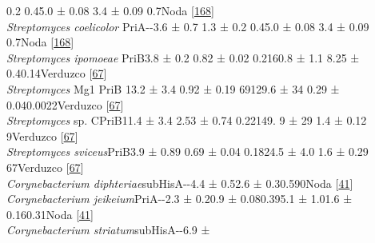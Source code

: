 \documentclass[12pt,twoside]{reedthesis}
\begin{document}
  0.2 \textbar{}0.4\textbar{}5.0 ± 0.08 \textbar{}3.4 ± 0.09
  \textbar{}0.7\textbar{}Noda
  {[}\protect\hyperlink{ref-noda-garcia_identification_2010}{168}{]}\textbar{}\\
  \textbar{} \emph{Streptomyces coelicolor}
  \textbar{}PriA\textbar{}-\textbar{}-\textbar{}3.6 ± 0.7 \textbar{}1.3 ±
  0.2 \textbar{}0.4\textbar{}5.0 ± 0.08 \textbar{}3.4 ± 0.09
  \textbar{}0.7\textbar{}Noda
  {[}\protect\hyperlink{ref-noda-garcia_identification_2010}{168}{]}\textbar{}\\
  \textbar{} \emph{Streptomyces ipomoeae}
  \textbar{}PriB\textbar{}\emph{\textbar{}}\textbar{}3.8 ± 0.2
  \textbar{}0.82 ± 0.02 \textbar{}0.21\textbar{}60.8 ± 1.1\textbar{} 8.25
  ± 0.4\textbar{}0.14\textbar{}Verduzco
  {[}\protect\hyperlink{ref-verduzco-castro_co-occurrence_2016}{67}{]}\textbar{}\\
  \textbar{} \emph{Streptomyces} Mg1
  \textbar{}PriB\textbar{}\emph{\textbar{}}\textbar{} 13.2 ± 3.4
  \textbar{}0.92 ± 0.19 \textbar{}69\textbar{}129.6 ± 34 \textbar{}0.29 ±
  0.04\textbar{}0.0022\textbar{}Verduzco
  {[}\protect\hyperlink{ref-verduzco-castro_co-occurrence_2016}{67}{]}\textbar{}\\
  \textbar{} \emph{Streptomyces} sp.
  C\textbar{}PriB\textbar{}\emph{\textbar{}}\textbar{}11.4 ± 3.4
  \textbar{}2.53 ± 0.74 \textbar{}0.22\textbar{}149. 9 ± 29\textbar{} 1.4
  ± 0.12 \textbar{}9\textbar{}Verduzco
  {[}\protect\hyperlink{ref-verduzco-castro_co-occurrence_2016}{67}{]}\textbar{}\\
  \textbar{} \emph{Streptomyces
  sviceus}\textbar{}PriB\textbar{}\emph{\textbar{}}\textbar{}3.9 ± 0.89
  \textbar{}0.69 ± 0.04 \textbar{}0.18\textbar{}24.5 ± 4.0\textbar{} 1.6 ±
  0.29 \textbar{}67\textbar{}Verduzco
  {[}\protect\hyperlink{ref-verduzco-castro_co-occurrence_2016}{67}{]}\textbar{}\\
  \textbar{} \emph{Corynebacterium
  diphteriae}\textbar{}subHisA\textbar{}-\textbar{}-\textbar{}4.4 ±
  0.5\textbar{}2.6 ±
  0.3\textbar{}0.59\textbar{}\textbar{}\textbar{}0\textbar{}Noda
  {[}\protect\hyperlink{ref-noda-garcia_evolution_2013}{41}{]}\textbar{}\\
  \textbar{} \emph{Corynebacterium
  jeikeium}\textbar{}PriA\textbar{}-\textbar{}-\textbar{}2.3 ±
  0.2\textbar{}0.9 ± 0.08\textbar{}0.39\textbar{}5.1 ± 1.0\textbar{}1.6 ±
  0.16\textbar{}0.31\textbar{}Noda
  {[}\protect\hyperlink{ref-noda-garcia_evolution_2013}{41}{]}\textbar{}\\
  \textbar{} \emph{Corynebacterium
  striatum}\textbar{}subHisA\textbar{}-\textbar{}-\textbar{}6.9 ±
\end{document}
